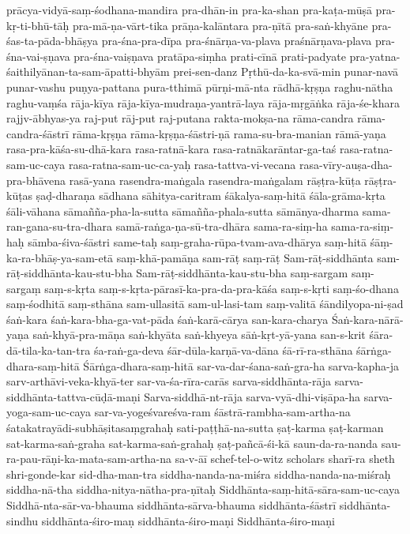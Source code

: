 {prācya-vidyā-saṃ-śodhana-mandira
pra-dhān-in
pra-ka-shan
pra-kaṭa-mūṣā
pra-kṛ-ti-bhū-tāḥ
pra-mā-ṇa-vārt-tika
prāṇa-kalāntara
pra-ṇītā
pra-saṅ-khyāne
pra-śas-ta-pāda-bhāṣya
pra-śna-pra-dīpa
pra-śnārṇa-va-plava
praśnārṇava-plava
pra-śna-vai-ṣṇava
pra-śna-vaiṣṇava
pratāpa-siṃha
prati-cīnā
prati-padyate
pra-yatna-śaithilyānan-ta-sam-āpatti-bhyām
prei-sen-danz
Pṛthū-da-ka-svā-min
punar-navā
punar-vashu
puṇya-pattana
pura-tthimā
pūrṇi-mā-nta
rādhā-kṛṣṇa
raghu-nātha
raghu-vaṃśa
rāja-kīya
rāja-kīya-mudraṇa-yantrā-laya
rāja-mṛgāṅka
rāja-śe-khara
rajjv-ābhyas-ya
raj-put
rāj-put
raj-putana
rakta-mokṣa-na
rāma-candra
rāma-candra-śāstrī
rāma-kṛṣṇa
rāma-kṛṣṇa-śāstri-ṇā
rama-su-bra-manian
rāmā-yaṇa
rasa-pra-kāśa-su-dhā-kara
rasa-ratnā-kara
rasa-ratnākarāntar-ga-taś
rasa-ratna-sam-uc-caya
rasa-ratna-sam-uc-ca-yaḥ
rasa-tattva-vi-vecana
rasa-vīry-auṣa-dha-pra-bhāvena
rasā-yana
rasendra-maṅgala
rasendra-maṅgalam
rāṣṭra-kūṭa
rāṣṭra-kūṭas
ṣaḍ-dharaṇa
sādhana
sāhitya-caritram 
śākalya-saṃ-hitā
śāla-grāma-kṛta
śāli-vāhana
sāmañña-pha-la-sutta
sāmañña-phala-sutta
sāmānya-dharma
sama-ran-gana-su-tra-dhara
samā-raṅga-ṇa-sū-tra-dhāra
sama-ra-siṃ-ha
sama-ra-siṃ-haḥ
sāmba-śiva-śāstri
same-taḥ
saṃ-graha-rūpa-tvam-ava-dhārya
saṃ-hitā
śāṃ-ka-ra-bhāṣ-ya-sam-etā
saṃ-khā-pamāṇa
sam-rāṭ
saṃ-rāṭ
Sam-rāṭ-siddhānta
sam-rāṭ-siddhānta-kau-stu-bha
Sam-rāṭ-siddhānta-kau-stu-bha
saṃ-sargam
saṃ-sargaṃ
saṃ-s-kṛta
saṃ-s-kṛta-pārasī-ka-pra-da-pra-kāśa
saṃ-s-kṛti 
saṃ-śo-dhana
saṃ-śodhitā
saṃ-sthāna
sam-ullasitā
sam-ul-lasi-tam
saṃ-valitā
śāndilyopa-ni-ṣad
śaṅ-kara
śaṅ-kara-bha-ga-vat-pāda
śaṅ-karā-cārya
san-kara-charya
Śaṅ-kara-nārā-yaṇa
saṅ-khyā-pra-māṇa
saṅ-khyāta
saṅ-khyeya
sāṅ-kṛt-yā-yana
san-s-krit
śāra-dā-tila-ka-tan-tra
śa-raṅ-ga-deva
śār-dūla-karṇā-va-dāna
śā-rī-ra-sthāna
śārṅga-dhara-saṃ-hitā
Śārṅga-dhara-saṃ-hitā
sar-va-dar-śana-saṅ-gra-ha
sarva-kapha-ja
sarv-arthāvi-veka-khyā-ter
sar-va-śa-rīra-carās
sarva-siddhānta-rāja
sarva-siddhānta-tattva-cūḍā-maṇi
Sarva-siddhā-nt-rāja
sarva-vyā-dhi-viṣāpa-ha
sarva-yoga-sam-uc-caya
sar-va-yogeśvareśva-ram
śāstrā-rambha-sam-artha-na
śatakatrayādi-subhāṣitasaṃgrahaḥ
sati-paṭṭhā-na-sutta
ṣaṭ-karma
ṣaṭ-karman
sat-karma-saṅ-graha
sat-karma-saṅ-grahaḥ
ṣaṭ-pañcā-śi-kā
saun-da-ra-nanda
sau-ra-pau-rāṇi-ka-mata-sam-artha-na
sa-v-āī
schef-tel-o-witz
scholars
sharī-ra
sheth
shri-gonde-kar
sid-dha-man-tra
siddha-nanda-na-miśra
siddha-nanda-na-miśraḥ
siddha-nā-tha
siddha-nitya-nātha-pra-ṇītaḥ
Siddhānta-saṃ-hitā-sāra-sam-uc-caya
Siddhā-nta-sār-va-bhauma
siddhānta-sārva-bhauma
siddhānta-śāstrī
siddhānta-sindhu
siddhānta-śiro-maṇ
siddhānta-śiro-maṇi
Siddhānta-śiro-maṇi
}
